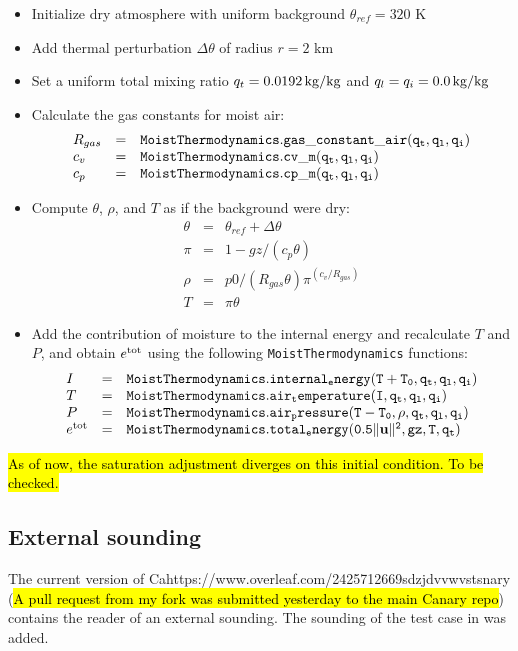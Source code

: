 \documentclass{article}
\begin{document}
\begin{itemize}
\item Initialize dry atmosphere with uniform background $\theta_{ref} = 320$ K
\item Add thermal perturbation $\Delta \theta$ of radius $r=2$ km
\item Set a uniform total mixing ratio $q_t = 0.0192 \,{\rm kg/kg}$ and $q_l = q_i = 0.0\,{\rm kg/kg}$
\item Calculate the gas constants for moist air: 
\[\begin{array}{lcl}
R_{gas} &=& {\tt MoistThermodynamics.gas\_constant\_air(q_t, q_l, q_i)}\\
c_v     &=& {\tt MoistThermodynamics.cv\_m(q_t, q_l, q_i)}\\
c_p     &=& {\tt MoistThermodynamics.cp\_m(q_t, q_l, q_i)}\\
\end{array}
\]
\item  Compute $\theta$, $\rho$, and $T$ as if the background were dry:\\
    \[ \begin{array}{lcl}
  \theta &=& \theta_{ref} + \Delta\theta\\
 \pi & =& 1 - gz/(c_p\theta)\\
 \rho & = & p0/(R_{gas}\theta)\pi^(c_v/R_{gas})\\
 T   & = &\pi \theta
\end{array}\]

\item Add the contribution of moisture to the internal energy and recalculate $T$ and $P$, and obtain $e^{\rm tot}$ using the following {\tt MoistThermodynamics} functions:
\[\begin{array}{lcl}
I &=& {\tt MoistThermodynamics.internal_energy(T + T_0, q_t, q_l, q_i)}\\
T &=& {\tt MoistThermodynamics.air_temperature(I, q_t, q_l, q_i)}\\
P &=& {\tt MoistThermodynamics.air_pressure(T - T_0, \rho, q_t, q_l, q_i)}\\
e^{\rm tot} &=& {\tt MoistThermodynamics.total_energy(0.5\|{\bf u} \|^2, gz, T, q_t)}
\end{array}\]
\end{itemize}

\hl{As of now, the saturation adjustment diverges on this initial condition. To be checked.}

\subsection{External sounding}
The current version of Cahttps://www.overleaf.com/2425712669sdzjdvvwvstsnary (\hl{A pull request from my fork was submitted yesterday to the main Canary repo}) contains the reader of an external sounding. The sounding of the test case in \citet{kurowskiEtAl2013} was added.
\end{document}
